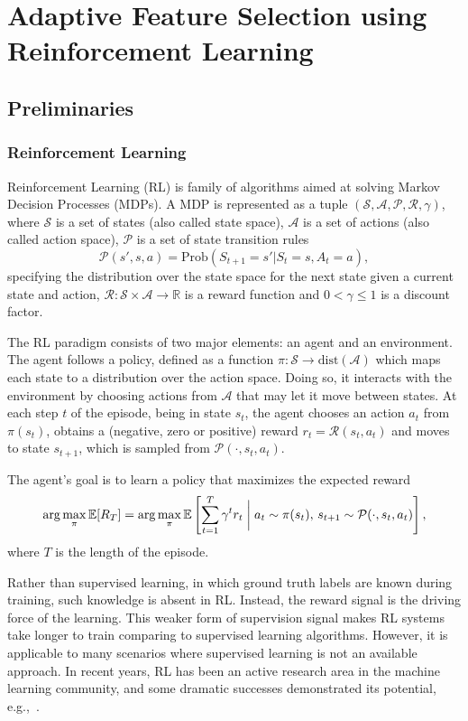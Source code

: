 \documentclass[reqno,11pt]{article}
\begin{document}
\section {Adaptive Feature Selection using Reinforcement Learning}\label{sec:afs}

\subsection {Preliminaries}\label{sec:preliminaries}
\subsubsection {Reinforcement Learning}\label{sec:rl}

Reinforcement Learning (RL) is family of algorithms aimed at solving Markov Decision Processes (MDPs).
A MDP is represented as a tuple $(\mathcal{S}, \mathcal{A}, \mathcal{P}, \mathcal{R}, \gamma)$,
where $\mathcal{S}$ is a set of states (also called state space), $ \mathcal{A}$ is a set of actions (also called action space), $\mathcal{P}$ is a set of state transition rules
$$\mathcal{P}(s', s, a) = \mbox{Prob}(S_{t+1} = s' | S_t = s, A_t = a),$$
specifying the distribution over the state space for the next state given a current state and action, $\mathcal{R}:\mathcal{S}\times \mathcal{A} \rightarrow \mathbb{R}$ is a reward function and $0 < \gamma \le 1$ is a discount factor.

The RL paradigm consists of two major elements: an agent and an
environment. 
The agent follows a policy, defined as a function $ \pi:\mathcal{S} \rightarrow \mbox{dist}(\mathcal{A})$ 
which maps each state to a distribution over the action space.
Doing so, it interacts with the environment by choosing actions from $\mathcal{A}$ that may let it move between states. 
At each step $t$ of the episode, being in state $s_t$, the agent chooses an action $a_t$ from $\pi(s_t)$, obtains a (negative, zero or positive) reward $r_t=\mathcal{R}(s_t, a_t)$ and moves to state $s_{t+1}$, which is sampled from  $\mathcal{P}(\cdot, s_t, a_t)$.

The agent's goal is to learn a policy that maximizes the expected reward
$$ \arg\max_\pi \mathbb{E}[R_T] = \arg\max_\pi \mathbb{E}\left[\sum_{t=1}^T\gamma^t r_t  \biggm\lvert a_t \sim \pi(s_t), \, s_{t+1} \sim\mathcal{P}(\cdot, s_t, a_t)\right] ,$$
where $T$ is the length of the episode.

Rather than supervised learning, in which ground truth labels
are known during training, such knowledge is absent in RL. 
Instead, the reward signal is the driving force of the learning. 
This weaker form of supervision signal makes RL systems take longer to train comparing to supervised learning algorithms. However, it is applicable to many scenarios where supervised learning is not an available approach.
In recent years, RL has been an active research area in the machine learning community, and some dramatic successes demonstrated its potential, e.g.,~\citep{silver2016mastering}.
\end{document}
